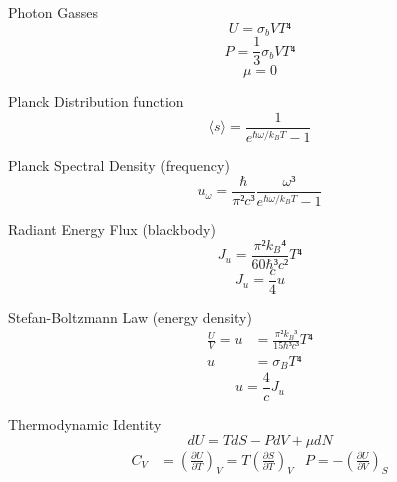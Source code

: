 \documentclass[avery5371,grid]{flashcards}
\begin{document}
\begin{flashcard}{Photon Gasses}
	\[ U = σ_b VT⁴ \]
	\[ P = \frac 13 σ_b VT⁴ \]
	\[ μ = 0 \]
\end{flashcard}

\begin{flashcard}{Planck Distribution function}
	\[ ⟨s⟩ = \frac{1}{e^{ℏω/k_B T} - 1} \]
\end{flashcard}

\begin{flashcard}{Planck Spectral Density (frequency)}
	\[ u_ω = \frac{ℏ}{π²c³} \frac{ω³}{e^{ℏω/k_B T} - 1} \]
\end{flashcard}

\begin{flashcard}{Radiant Energy Flux (blackbody)}
	\[ J_u = \frac{π²{k_B}⁴}{60ℏ³c²} T⁴ \]
	\[ J_u = \frac{c}{4} u \]
\end{flashcard}

\begin{flashcard}{Stefan-Boltzmann Law (energy density)}
	\begin{align*}
		\frac{U}{V} = u &= \frac{π²{k_B}³}{15ℏ³c³} T⁴ \\
			u &= σ_B T⁴
	\end{align*}
	\[ u = \frac{4}{c} J_u \]
\end{flashcard}

\begin{flashcard}{Thermodynamic Identity}
	\[ dU = T dS - P dV + μ dN \]
	\begin{align*}
		C_V &= (\frac{∂U}{∂T})_V = T (\frac{∂S}{∂T})_V
			& P = -(\frac{∂U}{∂V})_S
	\end{align*}
\end{flashcard}
\end{document}
